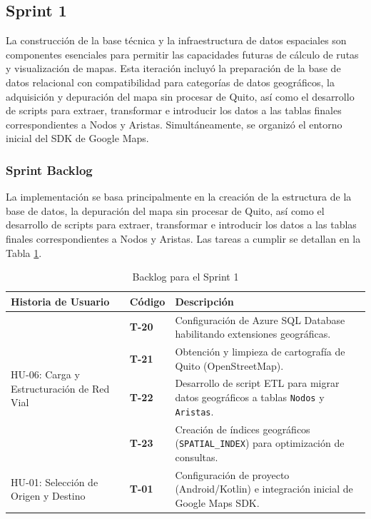\subsection{Sprint 1}

La construcción de la base técnica y la infraestructura de datos espaciales son componentes esenciales para permitir las capacidades futuras de cálculo de rutas y visualización de mapas. 
Esta iteración incluyó la preparación de la base de datos relacional con compatibilidad para categorías de datos geográficos, la adquisición y depuración del mapa sin procesar de Quito, así como el desarrollo de scripts para extraer, transformar e introducir los datos a las tablas finales correspondientes a Nodos y Aristas. Simultáneamente, se organizó el entorno inicial del SDK de Google Maps.

\subsubsection{Sprint Backlog}

La implementación se basa principalmente en la creación de la estructura de la base de datos, la depuración del mapa sin procesar de Quito, así como el desarrollo de scripts para extraer, transformar e introducir los datos a las tablas finales correspondientes a Nodos y Aristas. Las tareas a cumplir se detallan en la Tabla \ref{tab:sprint1-backlog}.

\begin{table}[H]
\caption{Backlog para el Sprint 1}
\label{tab:sprint1-backlog}
\centering

\begin{tabularx}{\textwidth}{|p{3.5cm}|p{1.5cm}|X|}
\hline
\textbf{Historia de Usuario} & \textbf{Código} & \textbf{Descripción} \\
\hline

\multirow{4}{3.5cm}{HU-06: Carga y Estructuración de Red Vial}
& \textbf{T-20} & Configuración de Azure SQL Database habilitando extensiones geográficas. \\
\cline{2-3}
& \textbf{T-21} & Obtención y limpieza de cartografía de Quito (OpenStreetMap). \\
\cline{2-3}
& \textbf{T-22} & Desarrollo de script ETL para migrar datos geográficos a tablas \texttt{Nodos} y \texttt{Aristas}. \\
\cline{2-3}
& \textbf{T-23} & Creación de índices geográficos (\texttt{SPATIAL\_INDEX}) para optimización de consultas. \\
\hline

\multirow{1}{3.5cm}{HU-01: Selección de Origen y Destino}
& \textbf{T-01} & Configuración de proyecto (Android/Kotlin) e integración inicial de Google Maps SDK. \\
\hline

\end{tabularx}
\end{table}

